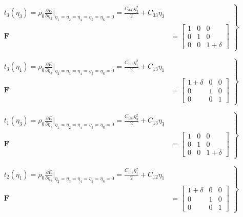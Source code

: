 \documentclass[showpacs,aps,floatfix,prb,reprint,superscriptaddress,onecolumn]{revtex4-1}
\begin{document}
\begin{equation}
\label{eqn:SM-s3}
  \left.\begin{aligned}
        t_{3} \left(\eta_{3}\right) = \rho_{0} \frac{\partial E}{\partial \eta_{3}}\Bigr|_{\eta_1=\eta_2=\eta_4=\eta_5=\eta_6=0} = \frac{C_{333}\eta_{3}^2}{2} + C_{33}\eta_{3}\\
        \bm{F}&=\begin{bmatrix} 1 & 0 & 0 \\ 0 & 1 & 0 \\ 0 & 0 & 1+\delta \end{bmatrix}
       \end{aligned}
			\right\}
\end{equation}


\begin{equation}
\label{eqn:SM-s4}
  \left.\begin{aligned}
        t_{3} \left(\eta_{1}\right) = \rho_{0} \frac{\partial E}{\partial \eta_{3}}\Bigr|_{\eta_2=\eta_3=\eta_4=\eta_5=\eta_6=0} = \frac{C_{113}\eta_{1}^2}{2} + C_{13}\eta_{1}\\
        \bm{F}&=\begin{bmatrix} 1+\delta & 0 & 0 \\ 0 & 1 & 0 \\ 0 & 0 & 1 \end{bmatrix}
       \end{aligned}
			\right\}
\end{equation}


\begin{equation}
\label{eqn:SM-s5}
  \left.\begin{aligned}
        t_{1} \left(\eta_{3}\right) = \rho_{0} \frac{\partial E}{\partial \eta_{1}}\Bigr|_{\eta_1=\eta_2=\eta_4=\eta_5=\eta_6=0} = \frac{C_{133}\eta_{3}^2}{2} + C_{13}\eta_{3}\\
        \bm{F}&=\begin{bmatrix} 1 & 0 & 0 \\ 0 & 1 & 0 \\ 0 & 0 & 1+\delta \end{bmatrix}
       \end{aligned}
			\right\}
\end{equation}


\begin{equation}
\label{eqn:SM-s6}
  \left.\begin{aligned}
        t_{2} \left(\eta_{1}\right) = \rho_{0} \frac{\partial E}{\partial \eta_{2}}\Bigr|_{\eta_2=\eta_3=\eta_4=\eta_5=\eta_6=0} = \frac{C_{112}\eta_{1}^2}{2} + C_{12}\eta_{1}\\
        \bm{F}&=\begin{bmatrix} 1+\delta & 0 & 0 \\ 0 & 1 & 0 \\ 0 & 0 & 1 \end{bmatrix}
       \end{aligned}
			\right\}
\end{equation}
\end{document}
